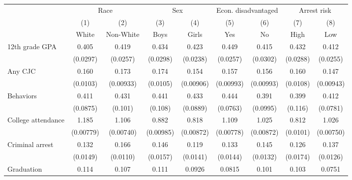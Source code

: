 \begin{tabular}{l*{8}{c}}
\hline\hline
                    &\multicolumn{2}{c}{Race} &\multicolumn{2}{c}{Sex}  &\multicolumn{2}{c}{Econ. disadvantaged}&\multicolumn{2}{c}{Arrest risk}\\\cmidrule(lr){2-3}\cmidrule(lr){4-5}\cmidrule(lr){6-7}\cmidrule(lr){8-9}
                    &\multicolumn{1}{c}{(1)}&\multicolumn{1}{c}{(2)}&\multicolumn{1}{c}{(3)}&\multicolumn{1}{c}{(4)}&\multicolumn{1}{c}{(5)}&\multicolumn{1}{c}{(6)}&\multicolumn{1}{c}{(7)}&\multicolumn{1}{c}{(8)}\\
                    &\multicolumn{1}{c}{White}&\multicolumn{1}{c}{Non-White}&\multicolumn{1}{c}{Boys}&\multicolumn{1}{c}{Girls}&\multicolumn{1}{c}{Yes}&\multicolumn{1}{c}{No}&\multicolumn{1}{c}{High}&\multicolumn{1}{c}{Low}\\
\hline
12th grade GPA      &       0.405&       0.419&       0.434&       0.423&       0.449&       0.415&       0.432&       0.412\\
                    &    (0.0297)&    (0.0257)&    (0.0298)&    (0.0238)&    (0.0257)&    (0.0302)&    (0.0288)&    (0.0255)\\
[1em]
Any CJC             &       0.160&       0.173&       0.174&       0.154&       0.157&       0.156&       0.160&       0.147\\
                    &    (0.0103)&   (0.00933)&    (0.0105)&   (0.00906)&   (0.00993)&   (0.00993)&    (0.0108)&   (0.00943)\\
[1em]
Behaviors           &       0.411&       0.431&       0.441&       0.433&       0.444&       0.391&       0.399&       0.412\\
                    &    (0.0875)&     (0.101)&     (0.108)&    (0.0889)&    (0.0763)&    (0.0995)&     (0.116)&    (0.0781)\\
[1em]
College attendance  &       1.185&       1.106&       0.882&       0.818&       1.109&       1.025&       0.812&       1.026\\
                    &   (0.00779)&   (0.00740)&   (0.00985)&   (0.00872)&   (0.00778)&   (0.00872)&    (0.0101)&   (0.00750)\\
[1em]
Criminal arrest     &       0.132&       0.166&       0.146&       0.119&       0.133&       0.145&       0.126&       0.137\\
                    &    (0.0149)&    (0.0110)&    (0.0157)&    (0.0141)&    (0.0144)&    (0.0132)&    (0.0174)&    (0.0126)\\
[1em]
Graduation          &       0.114&       0.107&       0.111&      0.0926&      0.0815&       0.101&       0.103&      0.0751\\

\end{tabular}
